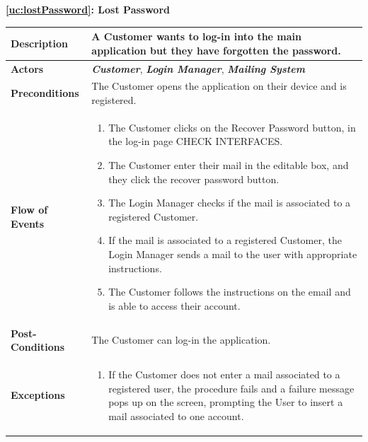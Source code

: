 \documentclass[a4paper, 10pt, oneside]{article}
\newcommand*{\lorenzo}[1]{\textcolor{BurntOrange}{#1}}
\begin{document}
\begin{center}
{\textbf{\ref{uc:lostPassword}: Lost Password}}
\end{center}
\begin{tabularx}{\linewidth}{| l | X |}
	
	\hline
	\textbf{Description} & A Customer wants to log-in into the main application but they have forgotten the password.\\
	

	\hline
	\textbf{Actors} & \textbf{\textit{Customer}}, \textit{\textbf{Login Manager}}, \textit{\textbf{Mailing System}} \\
	
	\hline
	\textbf{Preconditions} & The Customer opens the application on their device and is registered.\\
	
	\hline
	\textbf{Flow of Events} & \parbox{0.7\textwidth}{	
		\begin{enumerate}
			\item The Customer clicks on the Recover Password button, in the log-in page \lorenzo{CHECK INTERFACES}.
			\item The Customer enter their mail in the editable box, and they click the recover password button.
			\item The Login Manager checks if the mail is associated to a registered Customer.
			\item If the mail is associated to a registered Customer, the Login Manager sends a mail to the user with appropriate instructions.
			\item The Customer follows the instructions on the email and is able to access their account.
	\end{enumerate}}\\
	
	\hline
	\textbf{Post-Conditions} & The Customer can log-in the application.\\
	
	\hline
	\textbf{Exceptions} & \parbox{0.7\textwidth}{ \begin{enumerate}
			\item If the Customer does not enter a mail associated to a registered user, the procedure fails and a failure message pops up on the screen, prompting the User to insert a mail associated to one account.
		\end{enumerate}}\\

	\hline
	
\end{tabularx}
\end{document}
